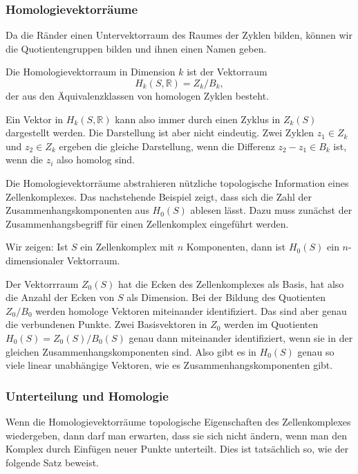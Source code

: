 \subsubsection{Homologievektorräume}
Da die Ränder einen Untervektorraum des Raumes der Zyklen bilden,
können wir die Quotientengruppen bilden und ihnen einen Namen geben.

\begin{definition}[Homologievektorraum]
Die Homologievektorraum in Dimension $k$ ist der Vektorraum
\[
H_k(S,\mathbb{R})
=
Z_k / B_k,
\]
der aus den Äquivalenzklassen von homologen Zyklen besteht.
\end{definition}

Ein Vektor in $H_k(S,\mathbb{R})$ kann also immer durch einen Zyklus
in $Z_k(S)$ dargestellt werden.
Die Darstellung ist aber nicht eindeutig.
Zwei Zyklen $z_1\in Z_k$ und $z_2\in Z_k$ ergeben die gleiche Darstellung,
wenn die Differenz $z_2-z_1\in B_k$ ist, wenn die $z_i$ also homolog sind.

Die Homologievektorräume abstrahieren nützliche topologische Information
eines Zellenkomplexes.
Das nachstehende Beispiel zeigt, dass sich die Zahl der
Zusammenhangskomponenten aus $H_0(S)$ ablesen lässt.
Dazu muss zunächst der Zusammenhangsbegriff für einen Zellenkomplex
eingeführt werden.

\begin{beispiel}
Wir zeigen: Ist $S$ ein Zellenkomplex mit $n$ Komponenten, dann ist 
$H_0(S)$ ein $n$-dimensionaler Vektorraum.
\medskip

Der Vektorrraum $Z_0(S)$ hat die Ecken des Zellenkomplexes als Basis,
hat also die Anzahl der Ecken von $S$ als Dimension.
Bei der Bildung des Quotienten $Z_0/B_0$ werden homologe Vektoren miteinander
identifiziert.
Das sind aber genau die verbundenen Punkte.
Zwei Basisvektoren in $Z_0$ werden im Quotienten $H_0(S)=Z_0(S)/B_0(S)$
genau dann miteinander identifiziert, wenn sie in der gleichen
Zusammenhangskomponenten sind.
Also gibt es in $H_0(S)$ genau so viele linear unabhängige Vektoren,
wie es Zusammenhangskomponenten gibt.
\end{beispiel}

%
%
\subsubsection{Unterteilung und Homologie}
Wenn die Homologievektorräume topologische Eigenschaften des Zellenkomplexes
wiedergeben, dann darf man erwarten, dass sie sich nicht
ändern, wenn man den Komplex durch Einfügen neuer Punkte unterteilt.
Dies ist tatsächlich so, wie der folgende Satz beweist.

